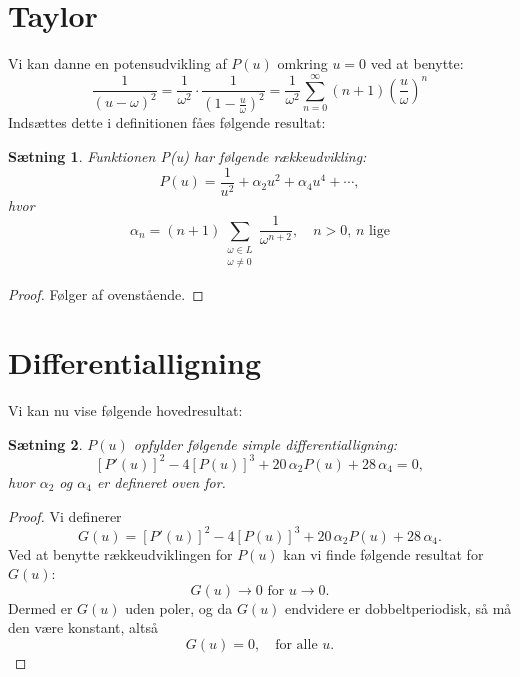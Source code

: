 \documentclass[12pt,oneside,a4paper]{article}
\newcommand{\be}{\begin{equation}}
\newcommand{\ee}{\end{equation}}
\newtheorem{thm}{Sætning}[section]
\begin{document}
\section{Taylor}

Vi kan danne en potensudvikling af $P(u)$ omkring $u=0$ ved at benytte:
\be
\frac{1}{(u-\omega)^2} = 
\frac{1}{\omega^2} \cdot \frac{1}{\left(1-\frac{u}{\omega}\right)^2} =
\frac{1}{\omega^2} \sum_{n=0}^\infty 
  (n+1) \left(\frac{u}{\omega}\right)^n
\ee
Indsættes dette i definitionen fåes følgende resultat:
\begin{thm}
    Funktionen P(u) har følgende rækkeudvikling:
\be
P(u) = \frac{1}{u^2} + \alpha_2 u^2 + \alpha_4 u^4 + \cdots,
\ee
hvor
\be
\alpha_n = (n+1) \sum_{\substack{\omega\in L\\ \omega\neq 0}} \frac{1}{\omega^{n+2}},
\quad \mbox{$n>0$, $n$ lige}
\label{alphan}
\ee
\end{thm}
\begin{proof}
    Følger af ovenstående.
\end{proof}

\section{Differentialligning}
Vi kan nu vise følgende hovedresultat:
\begin{thm}
$P(u)$ opfylder følgende simple differentialligning:
\be
\left[P'(u)\right]^2 - 4 \left[P(u)\right]^3
+ 20\,\alpha_2 P(u) + 28\,\alpha_4 = 0,
\ee
hvor $\alpha_2$ og $\alpha_4$ er defineret oven for.
\end{thm}
\begin{proof}
Vi definerer
\be
G(u) = \left[P'(u)\right]^2 - 4 \left[P(u)\right]^3
+ 20\,\alpha_2 P(u) + 28\,\alpha_4.
\ee
Ved at benytte rækkeudviklingen for $P(u)$ kan vi finde følgende
resultat for $G(u)$:
$$
G(u) \rightarrow 0 \mbox{ for } u \rightarrow 0.
$$
Dermed er $G(u)$ uden poler, og da $G(u)$ endvidere er dobbeltperiodisk,
så må den være konstant, altså
$$
G(u) = 0, \quad \mbox{for alle $u$.}
$$
\end{proof}
\end{document}
